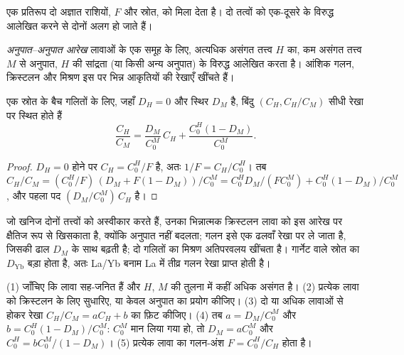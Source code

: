 एक प्रतिरूप दो अज्ञात राशियों, $F$ और स्रोत, को मिला देता है।
दो तत्वों को एक-दूसरे के विरुद्ध आलेखित करने से दोनों अलग हो जाते हैं।

\begin{definition}[अनुपात--अनुपात आरेख]\label{def:b3:trace-element-modelling:ratios}
\emph{अनुपात--अनुपात आरेख} लावाओं के एक समूह के लिए,
अत्यधिक असंगत तत्त्व $H$ का, कम असंगत तत्त्व $M$ से अनुपात,
$H$ की सांद्रता (या किसी अन्य अनुपात) के विरुद्ध आलेखित करता है।
आंशिक गलन, क्रिस्टलन और मिश्रण इस पर भिन्न आकृतियों की रेखाएँ
खींचते हैं।
\end{definition}

\begin{proposition}[बैच गलन रेखा]\label{prop:b3:trace-element-modelling:line}
एक स्रोत के बैच गलितों के लिए, जहाँ $D_H = 0$ और स्थिर $D_M$ है, बिंदु
$(C_H, C_H/C_M)$ सीधी रेखा पर स्थित होते हैं
\[
\frac{C_H}{C_M} = \frac{D_M}{C_0^M}\,C_H + \frac{C_0^H(1 - D_M)}{C_0^M}.
\]
\end{proposition}

\begin{proof}
$D_H = 0$ होने पर $C_H = C_0^H/F$ है, अतः $1/F = C_H/C_0^H$। तब
$C_H/C_M = (C_0^H/F)\,(D_M + F(1 - D_M))/C_0^M = C_0^HD_M/(FC_0^M) +
C_0^H(1 - D_M)/C_0^M$, और पहला पद $(D_M/C_0^M)\,C_H$ है।
\end{proof}

जो खनिज दोनों तत्त्वों को अस्वीकार करते हैं, उनका भिन्नात्मक क्रिस्टलन लावा को
इस आरेख पर क्षैतिज रूप से खिसकाता है, क्योंकि अनुपात नहीं बदलता; गलन इसे
एक ढलवाँ रेखा पर ले जाता है, जिसकी ढाल $D_M$ के साथ बढ़ती है; दो गलितों का मिश्रण
अतिपरवलय खींचता है। गार्नेट वाले स्रोत का $D_{\mathrm{Yb}}$ बड़ा होता है, अतः
La/Yb बनाम La में तीव्र गलन रेखा प्राप्त होती है।

\begin{method}[दो लावाओं का व्युत्क्रमण]\label{met:b3:trace-element-modelling:invert}
(1) जाँचिए कि लावा सह-जनित हैं और $H$, $M$ की तुलना में कहीं अधिक
असंगत है। (2) प्रत्येक लावा को क्रिस्टलन के लिए सुधारिए, या केवल अनुपात का प्रयोग कीजिए।
(3) दो या अधिक लावाओं से होकर रेखा $C_H/C_M = aC_H + b$ का फ़िट कीजिए। (4) तब
$a = D_M/C_0^M$ और $b = C_0^H(1 - D_M)/C_0^M$: $C_0^M$ मान लिया गया हो, तो $D_M =
aC_0^M$ और $C_0^H = bC_0^M/(1 - D_M)$। (5) प्रत्येक लावा का गलन-अंश
$F = C_0^H/C_H$ होता है।
\end{method}

